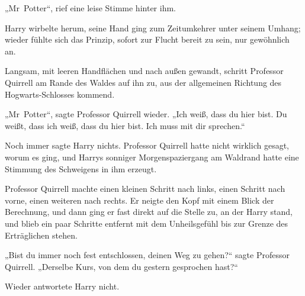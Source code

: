„Mr~Potter“, rief eine leise Stimme hinter ihm.

Harry wirbelte herum, seine Hand ging zum Zeitumkehrer unter seinem Umhang; wieder fühlte sich das Prinzip, sofort zur Flucht bereit zu sein, nur gewöhnlich an.

Langsam, mit leeren Handflächen und nach außen gewandt, schritt Professor Quirrell am Rande des Waldes auf ihn zu, aus der allgemeinen Richtung des Hogwarts-Schlosses kommend.

„Mr~Potter“, sagte Professor Quirrell wieder.
„Ich weiß, dass du hier bist. Du weißt, dass ich weiß, dass du hier bist. Ich muss mit dir sprechen.“

Noch immer sagte Harry nichts. Professor Quirrell hatte nicht wirklich gesagt, worum es ging, und Harrys sonniger Morgenspaziergang am Waldrand hatte eine Stimmung des Schweigens in ihm erzeugt.

Professor Quirrell machte einen kleinen Schritt nach links, einen Schritt nach vorne, einen weiteren nach rechts. Er neigte den Kopf mit einem Blick der Berechnung, und dann ging er fast direkt auf die Stelle zu, an der Harry stand, und blieb ein paar Schritte entfernt mit dem Unheilsgefühl bis zur Grenze des Erträglichen stehen.

„Bist du immer noch fest entschlossen, deinen Weg zu gehen?“ sagte Professor Quirrell.
„Derselbe Kurs, von dem du gestern gesprochen hast?“

Wieder antwortete Harry nicht.

